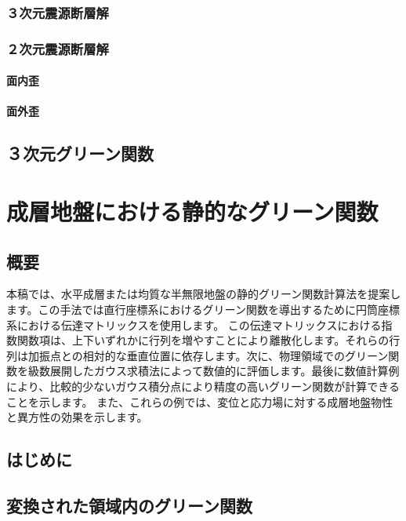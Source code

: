 \subsubsection{３次元震源断層解}

\subsubsection{２次元震源断層解}

\paragraph{面内歪}

\paragraph{面外歪}

\subsection{３次元グリーン関数}

\section{成層地盤における静的なグリーン関数}

\subsection{概要}

本稿では、水平成層または均質な半無限地盤の静的グリーン関数計算法を提案します。この手法では直行座標系におけるグリーン関数を導出するために円筒座標系における伝達マトリックスを使用します。
この伝達マトリックスにおける指数関数項は、上下いずれかに行列を増やすことにより離散化します。それらの行列は加振点との相対的な垂直位置に依存します。次に、物理領域でのグリーン関数を級数展開したガウス求積法によって数値的に評価します。最後に数値計算例により、比較的少ないガウス積分点により精度の高いグリーン関数が計算できることを示します。
また、これらの例では、変位と応力場に対する成層地盤物性と異方性の効果を示します。

\subsection{はじめに}

\subsection{変換された領域内のグリーン関数}

